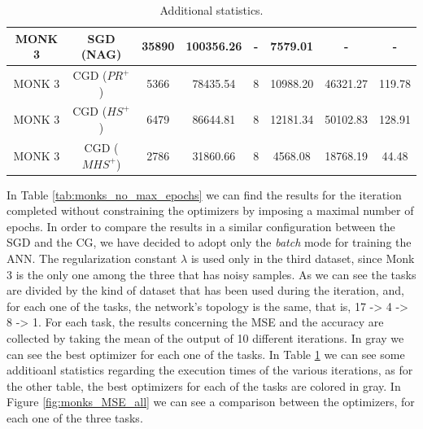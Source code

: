 \begin{table}[H]
\begin{subtable}{\textwidth}
{\begin{tabular}{| c | c | c | c | c | c | c | c |}
                            \hline
                            MONK 3 & SGD (NAG) & 35890 & 100356.26 & - & 7579.01 & - & - \\
                            \hline
                            MONK 3 & CGD ($PR^{+}$) & 5366 & 78435.54 & 8 & 10988.20 & 46321.27 & 119.78 \\
                            \hline
                            MONK 3 & CGD ($HS^{+}$) & 6479 & 86644.81 & 8 & 12181.34 & 50102.83 & 128.91 \\
                            \hline
                            \rowcolor[gray]{.9}
                            MONK 3 & CGD ($MHS^{+}$) & 2786 & 31860.66 & 8 & 4568.08 & 18768.19 & 44.48 \\
                            \hline
                        \end{tabular}
                    }
                \end{subtable}
                \caption{Additional statistics.}
                \label{tab:monks_additional_no_max_epochs}
            \end{table}

            In Table \ref{tab:monks_no_max_epochs} we can find the results for the iteration completed without
            constraining the optimizers by imposing a maximal number of epochs. In order to compare the
            results in a similar configuration between the SGD and the CG, we have decided to adopt only the
            \textit{batch} mode for training the ANN. The regularization constant $\lambda$ is used only in
            the third dataset, since Monk 3 is the only one among the three that has noisy samples. As we can
            see the tasks are divided by the kind of dataset that has been used during the iteration, and, for
            each one of the tasks, the network's topology is the same, that is, 17 -> 4 -> 8 -> 1. For each
            task, the results concerning the MSE and the accuracy are collected by taking the mean of the
            output of 10 different iterations. In gray we can see the best optimizer for each one of the
            tasks. In Table \ref{tab:monks_additional_no_max_epochs} we can see some additioanl statistics
            regarding the execution times of the various iterations, as for the other table, the best
            optimizers for each of the tasks are colored in gray.
            In Figure \ref{fig:monks_MSE_all} we can see a comparison between the optimizers, for each one of
            the three tasks.

